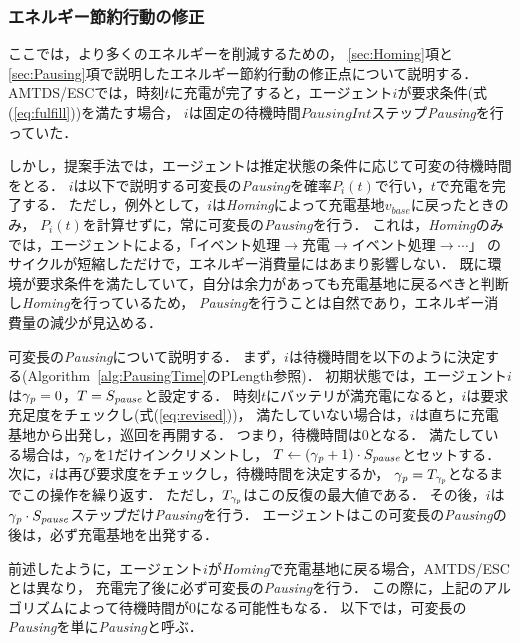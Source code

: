 \documentclass[12pt,a4j,twoside]{jarticle}
\def\PausingInt{{S_{\it pause}}}
\def\PauseTimeFactor{{\gamma_{\it p}}}
\begin{document}
  \subsubsection{エネルギー節約行動の修正}\label{sec:changeEnergySaving}
  ここでは，より多くのエネルギーを削減するための，
  \ref{sec:Homing}項と\ref{sec:Pausing}項で説明したエネルギー節約行動の修正点について説明する．
  AMTDS/ESCでは，時刻$t$に充電が完了すると，エージェント$i$が要求条件(式(\ref{eq:fulfill}))を満たす場合，
  $i$は固定の待機時間$PausingInt$ステップ{\em Pausing}を行っていた．
  \par

  しかし，提案手法では，エージェントは推定状態の条件に応じて可変の待機時間をとる．
  $i$は以下で説明する可変長の{\em Pausing}を確率$P_i(t)$で行い，$t$で充電を完了する．
  ただし，例外として，$i$は{\em Homing}によって充電基地$v_{base}$に戻ったときのみ，
  $P_i(t)$を計算せずに，常に可変長の{\em Pausing}を行う．
  これは，{\em Homing}のみでは，エージェントによる，「イベント処理$\rightarrow$充電$\rightarrow$イベント処理$\rightarrow\cdots$」
  のサイクルが短縮しただけで，エネルギー消費量にはあまり影響しない．
  既に環境が要求条件を満たしていて，自分は余力があっても充電基地に戻るべきと判断し{\em Homing}を行っているため，
  {\em Pausing}を行うことは自然であり，エネルギー消費量の減少が見込める．
  \par

  可変長の{\em Pausing}について説明する．
  まず，$i$は待機時間を以下のように決定する(Algorithm~\ref{alg:PausingTime}の\textsf{PLength}参照)．
  初期状態では，エージェント$i$は$\PauseTimeFactor=0$，$T=\PausingInt$と設定する．
  時刻$t$にバッテリが満充電になると，$i$は要求充足度をチェックし(式(\ref{eq:revised}))，
  満たしていない場合は，$i$は直ちに充電基地から出発し，巡回を再開する．
  つまり，待機時間は0となる．
  満たしている場合は，$\PauseTimeFactor$を1だけインクリメントし，
  $T \leftarrow (\PauseTimeFactor+1)\cdot \PausingInt$とセットする．
  次に，$i$は再び要求度をチェックし，待機時間を決定するか，
  $\PauseTimeFactor=T_\PauseTimeFactor$となるまでこの操作を繰り返す．
  ただし，$T_\PauseTimeFactor$はこの反復の最大値である．
  その後，$i$は$\PauseTimeFactor\cdot\PausingInt$ステップだけ{\em Pausing}を行う．
  エージェントはこの可変長の{\em Pausing}の後は，必ず充電基地を出発する．
  \par

  前述したように，エージェント$i$が{\em Homing}で充電基地に戻る場合，AMTDS/ESCとは異なり，
  充電完了後に必ず可変長の{\em Pausing}を行う．
  この際に，上記のアルゴリズムによって待機時間が0になる可能性もなる．
  以下では，可変長の{\em Pausing}を単に{\em Pausing}と呼ぶ．
\end{document}

